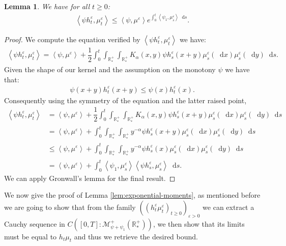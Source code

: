 \documentclass[11pt,a4paper]{article}
\newcommand{\RRP}{\mathbb{R}^+_*}
\newcommand{\MC}{\mathcal{M}}
\newcommand{\Proc}[1]{\left(#1\right)_{t\geq 0}}
\newcommand{\brac}[1]{\left\langle#1\right\rangle}
\newcommand{\dd}{\mathop{}\!\mathrm{d}}
\newtheorem{lemma}[theorem]{Lemma}
\begin{document}
\begin{lemma}\label{lem:exponential-moments-epsilon}
    We have for all $t \geq 0$:
    \begin{align*}
        \brac{\psi h^\varepsilon_t,\mu^\varepsilon_t} \leq \brac{\psi,\mu^\varepsilon}e^{\int_0^t \brac{\psi_1,\mu^\varepsilon_s}\dd s} .
    \end{align*}
\end{lemma}
\begin{proof}
    We compute the equation verified by $\brac{\psi h^\varepsilon_t,\mu^\varepsilon_t}$ we have:
    \begin{align*}
        \brac{\psi h^\varepsilon_t,\mu^\varepsilon_t} = \brac{\psi,\mu^\varepsilon} + \dfrac12\int_0^t \int_{\RRP}\int_{\RRP} K_\alpha(x,y) \psi h^\varepsilon_s(x+y)\mu^\varepsilon_s(\dd x)\mu^\varepsilon_s(\dd y)  \dd s.
    \end{align*}
    Given the shape of our kernel and the assumption on the monotony $\psi$ we have that:
    \begin{align*}
        \psi(x+y) h^\varepsilon_t(x+y) \leq \psi(x)h^\varepsilon_t(x).
    \end{align*}
    Consequently using the symmetry of the equation and the latter raised point,
    \begin{align*}
        \brac{\psi h^\varepsilon_t,\mu^\varepsilon_t} &= \brac{\psi,\mu^\varepsilon} + \dfrac12\int_0^t \int_{\RRP}\int_{\RRP} K_\alpha(x,y) \psi h^\varepsilon_s(x+y)\mu^\varepsilon_s(\dd x)\mu^\varepsilon_s(\dd y)  \dd s \\
        &= \brac{\psi,\mu^\varepsilon} + \int_0^t \int_{\RRP}\int_{\RRP} y^{-\alpha} \psi h^\varepsilon_s(x+y)\mu^\varepsilon_s(\dd x)\mu^\varepsilon_s(\dd y)  \dd s \\
        &\leq \brac{\psi,\mu^\varepsilon} + \int_0^t \int_{\RRP}\int_{\RRP} y^{-\alpha} \psi h^\varepsilon_s(x)\mu^\varepsilon_s(\dd x)\mu^\varepsilon_s(\dd y)  \dd s \\
        &= \brac{\psi,\mu^\varepsilon} + \int_0^t \brac{\psi_1,\mu^\varepsilon_s} \brac{\psi h^\varepsilon_s,\mu^\varepsilon_s}\dd s.
    \end{align*}
    We can apply Gronwall's lemma for the final result.
\end{proof}
We now give the proof of Lemma \ref{lem:exponential-moments}, as mentioned before we are going to show that from the family $\left( \Proc{h_t^\varepsilon\mu^\varepsilon_t}\right)_{\varepsilon > 0}$ we can extract a Cauchy sequence in $C\left([0,T]:\MC^+_{\psi + \psi_1}(\RRP)\right)$, we then show that its limits must be equal to $h_t\mu_t$ and thus we retrieve the desired bound.
\end{document}
